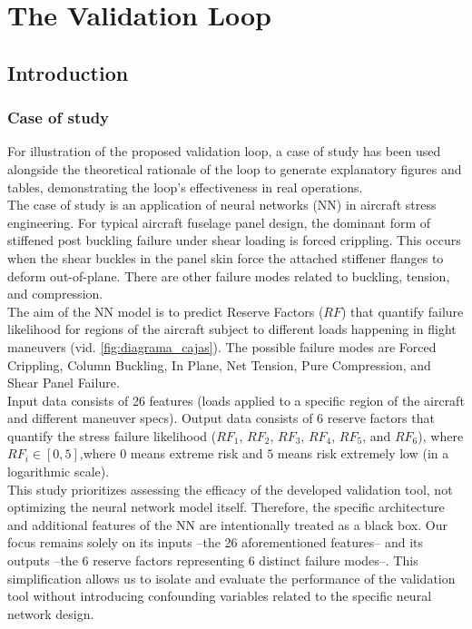 \chapter{The Validation Loop}
%
\label{chap:Chap_1}
%
%
\section{Introduction}
\subsection{Case of study}
\indent For illustration of the proposed validation loop, a case of study has been used alongside the theoretical rationale of the loop to generate explanatory figures and tables, demonstrating the loop's effectiveness in real operations.\\
%
\indent The case of study is an application of neural networks (NN) in aircraft stress engineering. For typical aircraft fuselage panel design, the dominant form of stiffened post buckling failure under shear loading is forced crippling\cite{bijlaard1955buckling}. This occurs when the shear buckles in the panel skin force the attached stiffener flanges to deform out-of-plane. There are other failure modes related to buckling, tension, and compression.\\
%
\indent The aim of the NN model is to predict Reserve Factors ($RF$) that quantify failure likelihood for regions of the aircraft subject to different loads happening in flight maneuvers (vid. \autoref{fig:diagrama_cajas}). The possible failure modes are Forced Crippling, Column Buckling, In Plane, Net Tension, Pure Compression, and Shear Panel Failure.\\
%
\indent Input data consists of 26 features (loads applied to a specific region of the aircraft and different maneuver specs). Output data consists of 6 reserve factors that quantify the stress failure likelihood ($RF_1$, $RF_2$, $RF_3$, $RF_4$, $RF_5$, and $RF_6$), where $RF_i\in [0,5]$,where $0$ means extreme risk and $5$ means risk extremely low (in a logarithmic scale).\\
%
\indent This study prioritizes assessing the efficacy of the developed validation tool, not optimizing the neural network model itself. Therefore, the specific architecture and additional features of the NN are intentionally treated as a black box. Our focus remains solely on its inputs --the 26 aforementioned features-- and its outputs --the 6 reserve factors representing 6 distinct failure modes--. This simplification allows us to isolate and evaluate the performance of the validation tool without introducing confounding variables related to the specific neural network design.\\
